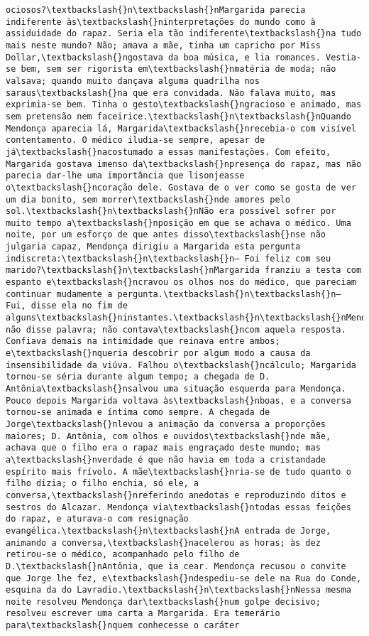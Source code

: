 \begin{Verbatim}[commandchars=\\\{\}]
ociosos?\textbackslash{}n\textbackslash{}nMargarida parecia indiferente às\textbackslash{}ninterpretações do mundo como à assiduidade do rapaz. Seria ela tão indiferente\textbackslash{}na tudo mais neste mundo? Não; amava a mãe, tinha um capricho por Miss Dollar,\textbackslash{}ngostava da boa música, e lia romances. Vestia-se bem, sem ser rigorista em\textbackslash{}nmatéria de moda; não valsava; quando muito dançava alguma quadrilha nos saraus\textbackslash{}na que era convidada. Não falava muito, mas exprimia-se bem. Tinha o gesto\textbackslash{}ngracioso e animado, mas sem pretensão nem faceirice.\textbackslash{}n\textbackslash{}nQuando Mendonça aparecia lá, Margarida\textbackslash{}nrecebia-o com visível contentamento. O médico iludia-se sempre, apesar de já\textbackslash{}nacostumado a essas manifestações. Com efeito, Margarida gostava imenso da\textbackslash{}npresença do rapaz, mas não parecia dar-lhe uma importância que lisonjeasse o\textbackslash{}ncoração dele. Gostava de o ver como se gosta de ver um dia bonito, sem morrer\textbackslash{}nde amores pelo sol.\textbackslash{}n\textbackslash{}nNão era possível sofrer por muito tempo a\textbackslash{}nposição em que se achava o médico. Uma noite, por um esforço de que antes disso\textbackslash{}nse não julgaria capaz, Mendonça dirigiu a Margarida esta pergunta indiscreta:\textbackslash{}n\textbackslash{}n— Foi feliz com seu marido?\textbackslash{}n\textbackslash{}nMargarida franziu a testa com espanto e\textbackslash{}ncravou os olhos nos do médico, que pareciam continuar mudamente a pergunta.\textbackslash{}n\textbackslash{}n— Fui, disse ela no fim de alguns\textbackslash{}ninstantes.\textbackslash{}n\textbackslash{}nMendonça não disse palavra; não contava\textbackslash{}ncom aquela resposta. Confiava demais na intimidade que reinava entre ambos; e\textbackslash{}nqueria descobrir por algum modo a causa da insensibilidade da viúva. Falhou o\textbackslash{}ncálculo; Margarida tornou-se séria durante algum tempo; a chegada de D. Antônia\textbackslash{}nsalvou uma situação esquerda para Mendonça. Pouco depois Margarida voltava às\textbackslash{}nboas, e a conversa tornou-se animada e íntima como sempre. A chegada de Jorge\textbackslash{}nlevou a animação da conversa a proporções maiores; D. Antônia, com olhos e ouvidos\textbackslash{}nde mãe, achava que o filho era o rapaz mais engraçado deste mundo; mas a\textbackslash{}nverdade é que não havia em toda a cristandade espírito mais frívolo. A mãe\textbackslash{}nria-se de tudo quanto o filho dizia; o filho enchia, só ele, a conversa,\textbackslash{}nreferindo anedotas e reproduzindo ditos e sestros do Alcazar. Mendonça via\textbackslash{}ntodas essas feições do rapaz, e aturava-o com resignação evangélica.\textbackslash{}n\textbackslash{}nA entrada de Jorge, animando a conversa,\textbackslash{}nacelerou as horas; às dez retirou-se o médico, acompanhado pelo filho de D.\textbackslash{}nAntônia, que ia cear. Mendonça recusou o convite que Jorge lhe fez, e\textbackslash{}ndespediu-se dele na Rua do Conde, esquina da do Lavradio.\textbackslash{}n\textbackslash{}nNessa mesma noite resolveu Mendonça dar\textbackslash{}num golpe decisivo; resolveu escrever uma carta a Margarida. Era temerário para\textbackslash{}nquem conhecesse o caráter 
\end{Verbatim}
